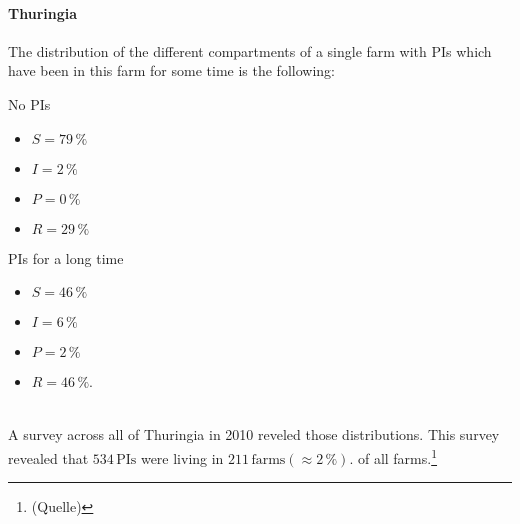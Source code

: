 \paragraph{Thuringia}
The distribution of the different compartments of a single farm with PIs which have been in this farm for some time is the following:
\\
\begin{minipage}[t]{0.5\linewidth}
No PIs
    \begin{itemize}
    \item $S= 79\,\%$
\item $I= 2\,\%$
\item $P= 0\,\%$ 
\item $R= 29\,\%$
    \end{itemize}
\end{minipage}
\begin{minipage}[t]{0.5\linewidth}
PIs for a long time
    \begin{itemize}
    \item $S= 46\,\%$
\item $I= 6\,\%$
\item $P= 2\,\%$ 
\item $R= 46\,\%$.
    \end{itemize}
\end{minipage}
\\
A survey across all of Thuringia in 2010 reveled those distributions. This survey revealed that $534\,\text{PIs}$ were living in $211\,\text{farms}(\approx 2\,\%)$. of all farms.\footnote{ (Quelle) }
